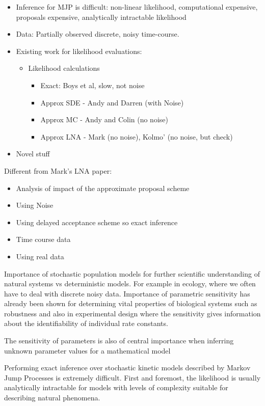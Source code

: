 \documentclass{pnastwo}
\begin{document}
\begin{article}
\begin{itemize}
\item Inference for MJP is difficult: non-linear likelihood, computational
  expensive, proposals expensive, analytically intractable likelihood
\item Data: Partially observed discrete, noisy time-course.
\item Existing work for likelihood evaluations: 
\begin{itemize}
\item Likelihood calculations
\begin{itemize}
\item Exact: Boys et al, slow, not noise
\item Approx SDE - Andy and Darren (with Noise)
\item Approx MC - Andy and Colin (no noise)
\item Approx LNA - Mark (no noise), Kolmo' (no noise, but check)
\end{itemize}
\end{itemize}
\item Novel stuff
\end{itemize}
Different from Mark's LNA paper:
\begin{itemize}
\item Analysis of impact of the approximate proposal scheme
\item Using Noise
\item Using delayed acceptance scheme so exact inference
\item Time course data
\item Using real data
\end{itemize}

Importance of stochastic population models for further scientific understanding of natural systems vs deterministic models.  For example in ecology, where we often have to deal with discrete noisy data.  Importance of parametric sensitivity has already been shown for determining vital properties of biological systems such as robustness and also in experimental design where the sensitivity gives information about the identifiability of individual rate constants.

The sensitivity of parameters is also of central importance when inferring unknown parameter values for a mathematical model

Performing exact inference over stochastic kinetic models described by Markov Jump Processes is extremely difficult.  First and foremost, the likelihood is usually analytically intractable for models with levels of complexity suitable for describing natural phenomena.


\end{article}
\end{document}
